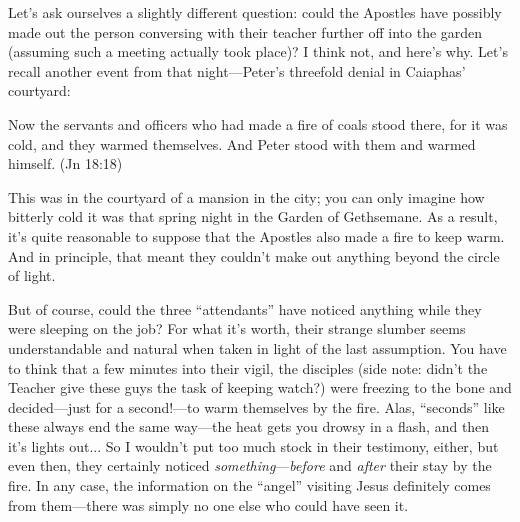 Let's ask ourselves a slightly different question: could the Apostles have possibly made out the person conversing with their teacher further off into the garden (assuming such a meeting actually took place)? I think not, and here's why. Let's recall another event from that night---Peter's threefold denial in Caiaphas' courtyard:

\begin{smallquote}
    Now the servants and officers who had made a fire of coals stood there, for it was cold, and they warmed themselves. And Peter stood with them and warmed himself. (Jn 18:18)
\end{smallquote}
This was in the courtyard of a mansion in the city; you can only imagine how bitterly cold it was that spring night in the Garden of Gethsemane. As a result, it's quite reasonable to suppose that the Apostles also made a fire to keep warm. And in principle, that meant they couldn't make out anything beyond the circle of light.

But of course, could the three ``attendants'' have noticed anything while they were sleeping on the job? For what it's worth, their strange slumber seems understandable and natural when taken in light of the last assumption. You have to think that a few minutes into their vigil, the disciples (side note: didn't the Teacher give these guys the task of keeping watch?) were freezing to the bone and decided---just for a second!---to warm themselves by the fire. Alas, ``seconds'' like these always end the same way---the heat gets you drowsy in a flash, and then it's lights out... So I wouldn't put too much stock in their testimony, either, but even then, they certainly noticed \emph{something}---\emph{before} and \emph{after} their stay by the fire. In any case, the information on the ``angel'' visiting Jesus definitely comes from them---there was simply no one else who could have seen it.